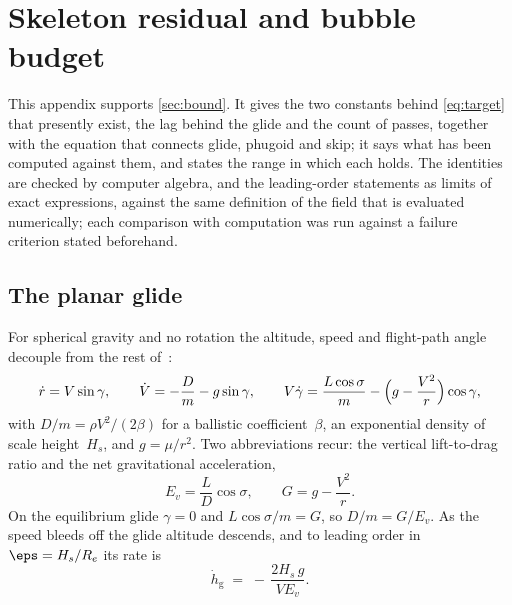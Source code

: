 
\section{Skeleton residual and bubble budget}
\label{apx:residual}

This appendix supports \cref{sec:bound}. It gives the two constants behind
\cref{eq:target} that presently exist, the lag behind the glide and the
count of passes, together with the equation that connects glide, phugoid
and skip; it says what has been computed against them, and states the range
in which each holds. The
identities are checked by computer algebra, and the leading-order
statements as limits of exact expressions, against the same definition of
the field that is evaluated numerically; each comparison with computation
was run against a failure criterion stated beforehand.

\subsection{The planar glide}\label{sec:residual-glide}

For spherical gravity and no rotation the altitude, speed and flight-path
angle decouple from the rest of~:
\[
  \dot r = V\sin\gamma,\qquad
  \dot V = -\frac{D}{m} - g\sin\gamma,\qquad
  V\dot\gamma = \frac{L\cos\sigma}{m} - \Bigl(g - \frac{V^2}{r}\Bigr)\cos\gamma ,
\]
with $D/m = \rho V^2/(2\beta)$ for a ballistic coefficient~$\beta$, an
exponential density of scale height~$H_s$, and $g = \mu/r^2$. Two
abbreviations recur: the vertical lift-to-drag ratio and the net
gravitational acceleration,
\[
  E_v = \frac{L}{D}\cos\sigma, \qquad G = g - \frac{V^2}{r} .
\]
On the equilibrium glide $\gamma = 0$ and $L\cos\sigma/m = G$, so
$D/m = G/E_v$. As the speed bleeds off the glide altitude descends, and to
leading order in $\eps = H_s/R_e$ its rate is
\begin{equation}\label{eq:glide-descent}
  \dot h_{\mathrm{g}} \;=\; -\,\frac{2H_s\,g}{V E_v} .
\end{equation}

